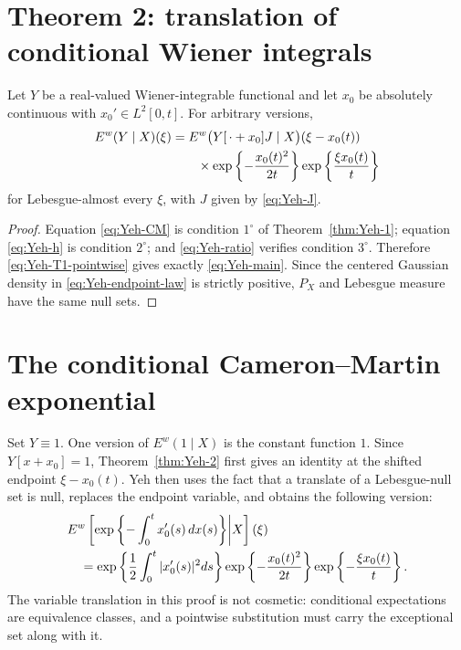 \section{Theorem 2: translation of conditional Wiener integrals}
\begin{theorem}\label{thm:Yeh-2}
Let $Y$ be a real-valued Wiener-integrable functional and let $x_0$ be absolutely continuous with $x_0'\in L^2[0,t]$.  For arbitrary versions,
\begin{align}
 E^w(Y\mid X)(\xi)
 &=E^w\bigl(Y[\,\cdot+x_0]J\mid X\bigr)(\xi-x_0(t))\notag\\
 &\qquad\times
 \exp\left\{-\frac{x_0(t)^2}{2t}\right\}
 \exp\left\{\frac{\xi x_0(t)}t\right\}
 \label{eq:Yeh-main}
\end{align}
for Lebesgue-almost every $\xi$, with $J$ given by \eqref{eq:Yeh-J}.
\end{theorem}

\begin{proof}
Equation \eqref{eq:Yeh-CM} is condition $1^\circ$ of Theorem~\ref{thm:Yeh-1}; equation \eqref{eq:Yeh-h} is condition $2^\circ$; and \eqref{eq:Yeh-ratio} verifies condition $3^\circ$.  Therefore \eqref{eq:Yeh-T1-pointwise} gives exactly \eqref{eq:Yeh-main}.  Since the centered Gaussian density in \eqref{eq:Yeh-endpoint-law} is strictly positive, $P_X$ and Lebesgue measure have the same null sets.
\end{proof}

\section{The conditional Cameron--Martin exponential}
Set $Y\equiv1$.  One version of $E^w(1\mid X)$ is the constant function $1$.  Since $Y[x+x_0]=1$, Theorem~\ref{thm:Yeh-2} first gives an identity at the shifted endpoint $\xi-x_0(t)$.  Yeh then uses the fact that a translate of a Lebesgue-null set is null, replaces the endpoint variable, and obtains the following version:
\begin{align}
 &E^w\left[
 \exp\left\{-\int_0^tx_0'(s)\,dx(s)\right\}
 \middle|X\right](\xi)\notag\\
 &\quad=
 \exp\left\{\frac12\int_0^t|x_0'(s)|^2ds\right\}
 \exp\left\{-\frac{x_0(t)^2}{2t}\right\}
 \exp\left\{-\frac{\xi x_0(t)}t\right\}.
 \label{eq:Yeh-corollary}
\end{align}
The variable translation in this proof is not cosmetic: conditional expectations are equivalence classes, and a pointwise substitution must carry the exceptional set along with it.

